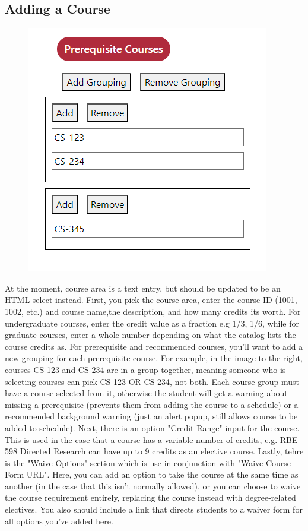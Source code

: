 \documentclass[12pt]{article}
\begin{document}
		\subsection{Adding a Course} 
			\begin{figure}
				\vspace*{-1.3cm}\includegraphics[scale=.6]{prereqexample}
			\end{figure}
			At the moment, course area is a text entry, but should be updated to be an HTML select instead. First, you pick the course area, enter the course ID (1001, 1002, etc.) and course name,the description, and how many credits its worth. For undergraduate courses, enter the credit value as a fraction e.g 1/3, 1/6, while for graduate courses, enter a whole number depending on what the catalog lists the course credits as. For prerequisite and recommended courses, you'll want to add a new grouping for each prerequisite course. For  example, in the image to the right, courses CS-123 and CS-234 are in a group together, meaning someone who is selecting courses can pick CS-123 OR CS-234, not both. Each course group must have a course selected from it, otherwise the student will get a warning about missing a prerequisite (prevents them from adding the course to a schedule) or a recommended background warning (just an alert popup, still allows course to be added to schedule). Next, there is an option "Credit Range" input for the course. This is used in the case that a course has a variable number of credits, e.g. RBE 598 Directed Research can have up to 9 credits as an elective course. Lastly, tehre is the "Waive Options" section which is use in conjunction with "Waive Course Form URL". Here, you can add an option to take the course at the same time as another (in the case that this isn't normally allowed), or you can choose to waive the course requirement entirely, replacing the course instead with degree-related electives. You also should include a link that directs students to a waiver form for all options you've added here.
			
\end{document}
